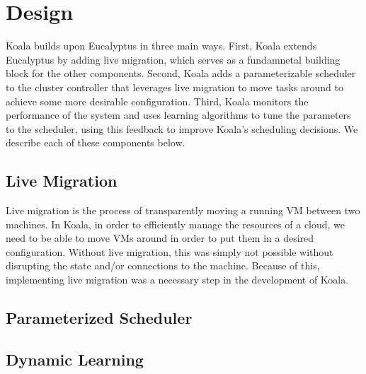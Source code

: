 \section{Design}

Koala builds upon Eucalyptus in three main ways.  First, Koala extends
Eucalyptus by adding live migration, which serves as a fundamnetal building
block for the other components.  Second, Koala adds a parameterizable scheduler
to the cluster controller that leverages live migration to move tasks around to
achieve some more desirable configuration.  Third, Koala monitors the
performance of the system and uses learning algorithms to tune the parameters to
the scheduler, using this feedback to improve Koala's scheduling decisions.  We
describe each of these components below.

\subsection{Live Migration}
Live migration is the process of transparently moving a running VM between two machines.  In Koala, in order to efficiently manage the resources of a cloud, we need to be able to move VMs around in order to put them in a desired configuration.  Without live migration, this was simply not possible without disrupting the state and/or connections to the machine.  Because of this, implementing live migration was a necessary step in the development of Koala.

\subsection{Parameterized Scheduler}

\subsection{Dynamic Learning}



